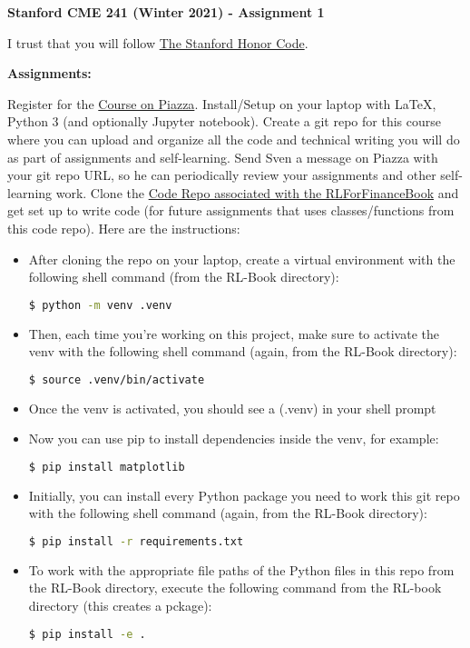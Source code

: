 \documentclass[12pt]{exam}
\begin{document}
\begin{center}
{\large {\bf Stanford CME 241 (Winter 2021) - Assignment 1}}
\end{center}

I trust that you will follow \href{https://communitystandards.stanford.edu/policies-and-guidance/honor-code}{The Stanford Honor Code}.
 
{\large{\bf Assignments:}}
\begin{questions}
\question Register for the \href{https://piazza.com/stanford/winter2021/cme241/home}{Course on Piazza}.
\question Install/Setup on your laptop with LaTeX, Python 3 (and optionally Jupyter notebook).
\question Create a git repo for this course where you can upload and organize all the code and technical writing you will do as part of assignments and self-learning.
\question Send Sven a message on Piazza with your git repo URL, so he can periodically review your assignments and other self-learning work.
\question Clone the \href{https://github.com/TikhonJelvis/RL-book}{Code Repo associated with the RLForFinanceBook} and get set up to write code (for future assignments that uses classes/functions from this code repo). Here are the instructions:
\begin{itemize}
\item After cloning the repo on your laptop, create a virtual environment with the following shell command (from the RL-Book directory):
\begin{lstlisting}[language=bash]
$ python -m venv .venv
\end{lstlisting}
\item Then, each time you're working on this project, make sure to activate the venv with the following shell command (again, from the RL-Book directory):
\begin{lstlisting}[language=bash]
$ source .venv/bin/activate
\end{lstlisting}
\item Once the venv is activated, you should see a (.venv) in your shell prompt
\item Now you can use pip to install dependencies inside the venv, for example:
\begin{lstlisting}[language=bash]
$ pip install matplotlib
\end{lstlisting}
\item Initially, you can install every Python package you need to work this git repo with the following shell command (again, from the RL-Book directory):
\begin{lstlisting}[language=bash]
$ pip install -r requirements.txt
\end{lstlisting}
\item To work with the appropriate file paths of the Python files in this repo from the RL-Book directory, execute the following command from the RL-book directory (this creates a pckage):
\begin{lstlisting}[language=bash]
$ pip install -e .
\end{lstlisting}
\end{itemize}
\end{questions}
\end{document}
